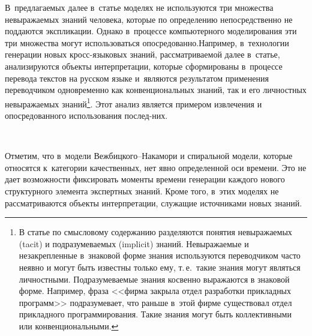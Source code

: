 {\begin{multicols}{2}
В~предлагаемых далее в~статье моделях не используются три 
множества невыражаемых знаний человека, которые по определению непосредст\-венно не 
поддаются экспликации. Однако в~процессе компьютерного моделирования эти три 
множества могут использоваться опосредованно.\linebreak Например, в~технологии генерации новых 
кросс-язы\-ко\-вых знаний, рас\-смат\-ри\-ва\-емой далее в~статье, анализируются объекты 
интерпретации, которые сформированы в~процессе перевода текстов на русском языке 
и~являются результатом применения переводчиком одновременно как конвенциональных 
знаний, так и его личностных невыражаемых знаний\footnote{В статье по смысловому 
содержанию разделяются понятия невыражаемых (tacit) и подразумеваемых (implicit) знаний. Невыражаемые 
и незакрепленные в~знаковой форме знания используются переводчиком часто неявно и могут быть известны 
только ему, т.\,е.\ такие знания могут являться личностными. Подразумеваемые знания косвенно выражаются 
в знаковой форме. Например, фраза <<фирма закрыла отдел разработки прикладных программ>> 
подразумевает, что раньше в~этой фирме существовал отдел прикладного программирования. Такие знания 
могут быть коллективными или конвенциональными.}. Этот анализ является примером извле\-чения и 
опосредованного использования послед-\linebreak них.

\begin{figure*} %
       \vspace*{1pt}
 \begin{center}
 \mbox{%
 \epsfxsize=160.234mm
 }
 \end{center}
 \vspace*{-9pt}
\end{figure*}


      
      
      Отметим, что в~модели Веж\-биц\-ко\-го--На\-ка\-мо\-ри и спиральной модели, 
которые относятся к~категории качественных, нет явно определенной оси времени. Это не 
дает возможности фиксировать моменты времени генерации каждого нового структурного 
элемента экспертных знаний. Кроме того, в~этих моделях не рассматриваются объекты 
интерпретации, служащие источниками новых знаний.

\pagebreak


\end{multicols}}
